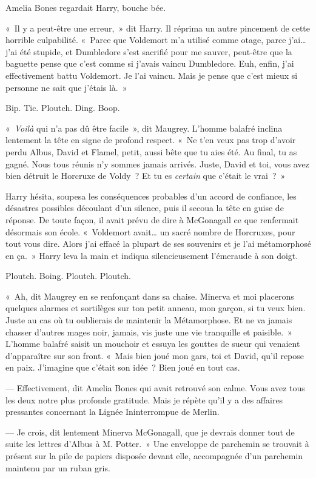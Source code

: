 Amelia Bones regardait Harry, bouche bée.

«~Il y a peut-être une erreur,~» dit Harry. Il réprima un autre pincement de cette horrible culpabilité. «~Parce que Voldemort m'a utilisé comme otage, parce j'ai… j'ai été stupide, et Dumbledore s'est sacrifié pour me sauver, peut-être que la baguette pense que c'est comme si j'avais vaincu Dumbledore. Euh, enfin, j'ai effectivement battu Voldemort. Je l'ai vaincu. Mais je pense que c'est mieux si personne ne sait que j'étais là.~»

Bip. Tic. Ploutch. Ding. Boop.

«~\emph{Voilà} qui n'a pas dû être facile~», dit Maugrey. L'homme balafré inclina lentement la tête en signe de profond respect. «~Ne t'en veux pas trop d'avoir perdu Albus, David et Flamel, petit, aussi bête que tu aies été. Au final, tu as gagné. Nous tous réunis n'y sommes jamais arrivés. Juste, David et toi, vous avez bien détruit le Horcruxe de Voldy~? Et tu es \emph{certain} que c'était le vrai~?~»

Harry hésita, soupesa les conséquences probables d'un accord de confiance, les désastres possibles découlant d'un silence, puis il secoua la tête en guise de réponse. De toute façon, il avait prévu de dire à McGonagall ce que renfermait désormais son école. «~Voldemort avait… un sacré nombre de Horcruxes, pour tout vous dire. Alors j'ai effacé la plupart de ses souvenirs et je l'ai métamorphosé en ça.~» Harry leva la main et indiqua silencieusement l'émeraude à son doigt.

Ploutch. Boing. Ploutch. Ploutch.

«~Ah, dit Maugrey en se renfonçant dans sa chaise. Minerva et moi placerons quelques alarmes et sortilèges sur ton petit anneau, mon garçon, si tu veux bien. Juste au cas où tu oublierais de maintenir la Métamorphose. Et ne va jamais chasser d'autres mages noir, jamais, vis juste une vie tranquille et paisible.~» L'homme balafré saisit un mouchoir et essuya les gouttes de sueur qui venaient d'apparaître sur son front. «~Mais bien joué mon gars, toi et David, qu'il repose en paix. J'imagine que c'était son idée~? Bien joué en tout cas.

--- Effectivement, dit Amelia Bones qui avait retrouvé son calme. Vous avez tous les deux notre plus profonde gratitude. Mais je répète qu'il y a des affaires pressantes concernant la Lignée Ininterrompue de Merlin.

--- Je crois, dit lentement Minerva McGonagall, que je devrais donner tout de suite les lettres d'Albus à M. Potter.~» Une enveloppe de parchemin se trouvait à présent sur la pile de papiers disposée devant elle, accompagnée d'un parchemin maintenu par un ruban gris.

